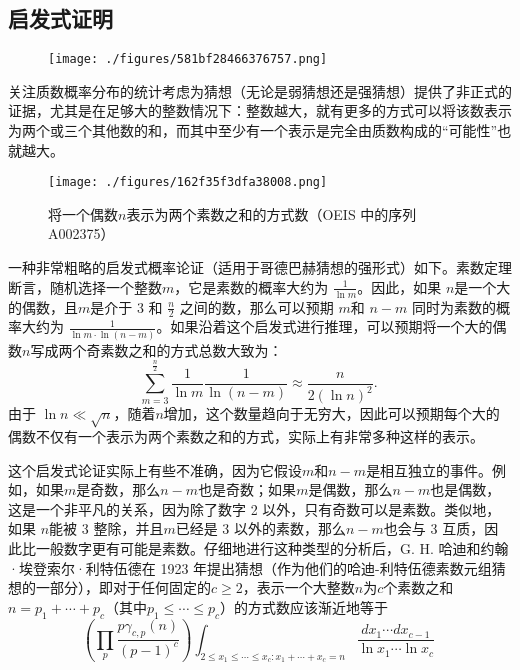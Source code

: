 \subsection{启发式证明}
\begin{figure}[ht]
\centering
\texttt{[image: ./figures/581bf28466376757.png]}
\caption{} \label{fig_GDBHCX_2}
\end{figure}
关注质数概率分布的统计考虑为猜想（无论是弱猜想还是强猜想）提供了非正式的证据，尤其是在足够大的整数情况下：整数越大，就有更多的方式可以将该数表示为两个或三个其他数的和，而其中至少有一个表示是完全由质数构成的“可能性”也就越大。
\begin{figure}[ht]
\centering
\texttt{[image: ./figures/162f35f3dfa38008.png]}
\caption{将一个偶数\(n\)表示为两个素数之和的方式数（OEIS 中的序列 A002375）} \label{fig_GDBHCX_3}
\end{figure}
一种非常粗略的启发式概率论证（适用于哥德巴赫猜想的强形式）如下。素数定理断言，随机选择一个整数\(m\)，它是素数的概率大约为 \( \frac{1}{\ln m} \)。因此，如果 \(n\)是一个大的偶数，且\(m\)是介于 3 和 \( \frac{n}{2} \) 之间的数，那么可以预期 \(m\)和 \( n - m \) 同时为素数的概率大约为 \( \frac{1}{\ln m \cdot \ln(n - m)} \)。如果沿着这个启发式进行推理，可以预期将一个大的偶数\(n\)写成两个奇素数之和的方式总数大致为：
\[
\sum _{m=3}^{\frac {n}{2}}{\frac {1}{\ln m}}{\frac {1}{\ln(n-m)}} \approx \frac{n}{2(\ln n)^{2}}.~
\]
由于 \( \ln n \ll \sqrt{n} \)，随着\(n\)增加，这个数量趋向于无穷大，因此可以预期每个大的偶数不仅有一个表示为两个素数之和的方式，实际上有非常多种这样的表示。

这个启发式论证实际上有些不准确，因为它假设\(m\)和\(n-m\)是相互独立的事件。例如，如果\(m\)是奇数，那么\(n-m\)也是奇数；如果\(m\)是偶数，那么\(n-m\)也是偶数，这是一个非平凡的关系，因为除了数字 2 以外，只有奇数可以是素数。类似地，如果 \(n\)能被 3 整除，并且\(m\)已经是 3 以外的素数，那么\(n-m\)也会与 3 互质，因此比一般数字更有可能是素数。仔细地进行这种类型的分析后，G. H. 哈迪和约翰·埃登索尔·利特伍德在 1923 年提出猜想（作为他们的哈迪-利特伍德素数元组猜想的一部分），即对于任何固定的\(c\ge2\)，表示一个大整数\(n\)为\(c\)个素数之和\(n = p_1+\cdots +p_c\)（其中\(p_1 ≤ ⋯ ≤ p_c\)）的方式数应该渐近地等于
\[
\left(\prod _{p}{\frac {p\gamma _{c,p}(n)}{(p-1)^{c}}}\right)\int _{2\leq x_{1}\leq \cdots \leq x_{c}:x_{1}+\cdots +x_{c}=n}{\frac {dx_{1}\cdots dx_{c-1}}{\ln x_{1}\cdots \ln x_{c}}}~
\]